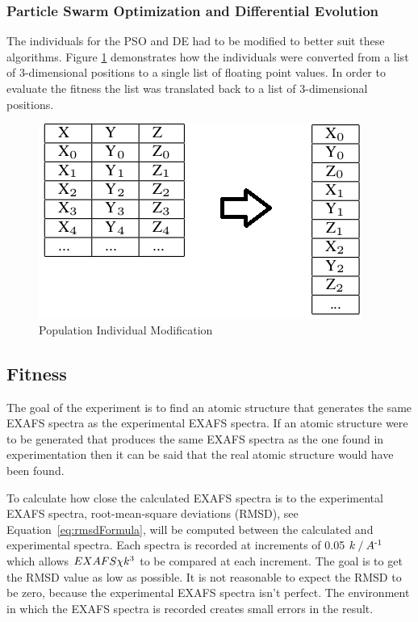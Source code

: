 \documentclass[conference]{IEEEtran}
\begin{document}
\subsubsection{Particle Swarm Optimization and Differential Evolution}

The individuals for the PSO and DE had to be modified to better suit these algorithms. Figure \ref{fig:postOpExplain} demonstrates how the individuals were converted from a list of 3-dimensional positions to a single list of floating point values. In order to evaluate the fitness the list was translated back to a list of 3-dimensional positions.

\begin{figure}
  \caption{Population Individual Modification}
  \label{fig:postOpExplain}
  \begin{center}
    \includegraphics[bb=0 0 400 241,scale=0.5]{refs/ThisBecomesThat.png}
  \end{center}
\end{figure}

\subsection{Fitness}

The goal of the experiment is to find an atomic structure that generates the same EXAFS spectra as the experimental EXAFS spectra. If an atomic structure were to be generated that produces the same EXAFS spectra as the one found in experimentation then it can be said that the real atomic structure would have been found.

To calculate how close the calculated EXAFS spectra is to the experimental EXAFS spectra, root-mean-square deviations (RMSD), see Equation~\ref{eq:rmsdFormula}, will be computed between the calculated and experimental spectra. Each spectra is recorded at increments of 0.05 $k \mathbin{/} A\textsuperscript{-1}$ which allows $EXAFS \chi k\textsuperscript{3}$ to be compared at each increment. The goal is to get the RMSD value as low as possible. It is not reasonable to expect the RMSD to be zero, because the experimental EXAFS spectra isn't perfect. The environment in which the EXAFS spectra is recorded creates small errors in the result.
\end{document}

